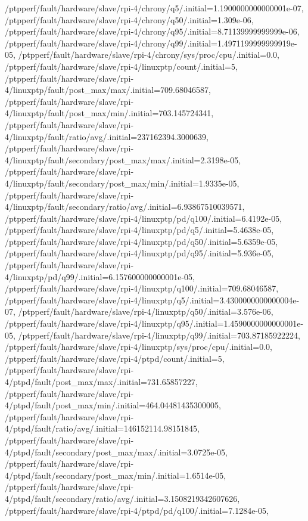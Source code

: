 {    /ptpperf/fault/hardware/slave/rpi-4/chrony/q5/.initial=1.1900000000000001e-07,
    /ptpperf/fault/hardware/slave/rpi-4/chrony/q50/.initial=1.309e-06,
    /ptpperf/fault/hardware/slave/rpi-4/chrony/q95/.initial=8.71139999999999e-06,
    /ptpperf/fault/hardware/slave/rpi-4/chrony/q99/.initial=1.4971199999999919e-05,
    /ptpperf/fault/hardware/slave/rpi-4/chrony/sys/proc/cpu/.initial=0.0,
    /ptpperf/fault/hardware/slave/rpi-4/linuxptp/count/.initial=5,
    /ptpperf/fault/hardware/slave/rpi-4/linuxptp/fault/post_max/max/.initial=709.68046587,
    /ptpperf/fault/hardware/slave/rpi-4/linuxptp/fault/post_max/min/.initial=703.145724341,
    /ptpperf/fault/hardware/slave/rpi-4/linuxptp/fault/ratio/avg/.initial=237162394.3000639,
    /ptpperf/fault/hardware/slave/rpi-4/linuxptp/fault/secondary/post_max/max/.initial=2.3198e-05,
    /ptpperf/fault/hardware/slave/rpi-4/linuxptp/fault/secondary/post_max/min/.initial=1.9335e-05,
    /ptpperf/fault/hardware/slave/rpi-4/linuxptp/fault/secondary/ratio/avg/.initial=6.93867510039571,
    /ptpperf/fault/hardware/slave/rpi-4/linuxptp/pd/q100/.initial=6.4192e-05,
    /ptpperf/fault/hardware/slave/rpi-4/linuxptp/pd/q5/.initial=5.4638e-05,
    /ptpperf/fault/hardware/slave/rpi-4/linuxptp/pd/q50/.initial=5.6359e-05,
    /ptpperf/fault/hardware/slave/rpi-4/linuxptp/pd/q95/.initial=5.936e-05,
    /ptpperf/fault/hardware/slave/rpi-4/linuxptp/pd/q99/.initial=6.157600000000001e-05,
    /ptpperf/fault/hardware/slave/rpi-4/linuxptp/q100/.initial=709.68046587,
    /ptpperf/fault/hardware/slave/rpi-4/linuxptp/q5/.initial=3.4300000000000004e-07,
    /ptpperf/fault/hardware/slave/rpi-4/linuxptp/q50/.initial=3.576e-06,
    /ptpperf/fault/hardware/slave/rpi-4/linuxptp/q95/.initial=1.4590000000000001e-05,
    /ptpperf/fault/hardware/slave/rpi-4/linuxptp/q99/.initial=703.87185922224,
    /ptpperf/fault/hardware/slave/rpi-4/linuxptp/sys/proc/cpu/.initial=0.0,
    /ptpperf/fault/hardware/slave/rpi-4/ptpd/count/.initial=5,
    /ptpperf/fault/hardware/slave/rpi-4/ptpd/fault/post_max/max/.initial=731.65857227,
    /ptpperf/fault/hardware/slave/rpi-4/ptpd/fault/post_max/min/.initial=464.04481435300005,
    /ptpperf/fault/hardware/slave/rpi-4/ptpd/fault/ratio/avg/.initial=146152114.98151845,
    /ptpperf/fault/hardware/slave/rpi-4/ptpd/fault/secondary/post_max/max/.initial=3.0725e-05,
    /ptpperf/fault/hardware/slave/rpi-4/ptpd/fault/secondary/post_max/min/.initial=1.6514e-05,
    /ptpperf/fault/hardware/slave/rpi-4/ptpd/fault/secondary/ratio/avg/.initial=3.1508219342607626,
    /ptpperf/fault/hardware/slave/rpi-4/ptpd/pd/q100/.initial=7.1284e-05,
}

